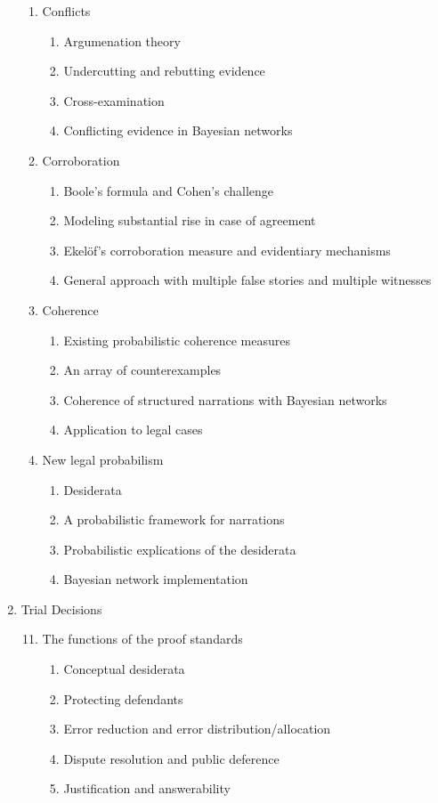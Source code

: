 \documentclass[10pt,dvipsnames,enabledeprecatedfontcommands]{scrartcl}
\begin{document}
\begin{enumerate}
\begin{enumerate}
  \item Conflicts
  \begin{enumerate}
  \item Argumenation theory
  \item Undercutting and rebutting evidence
  \item Cross-examination
  \item Conflicting evidence in Bayesian networks
  \end{enumerate}
 
 
  \item Corroboration
  \begin{enumerate}
  \item Boole's formula and Cohen's challenge
  \item  Modeling substantial rise in case of agreement
  \item Ekel\"of's corroboration measure and evidentiary mechanisms
  \item General approach with multiple false stories and multiple witnesses
  \end{enumerate}


  \item Coherence
  \begin{enumerate}
  \item  Existing probabilistic coherence measures
  \item  An array of counterexamples
  \item Coherence of structured narrations with Bayesian networks
  \item  Application to legal cases
  \end{enumerate}

  \item  New legal probabilism
    \begin{enumerate}
    \item  Desiderata
    \item  A probabilistic framework for narrations
    \item  Probabilistic explications of the desiderata
    \item  Bayesian network implementation
    \end{enumerate}


\end{enumerate}
\item  Trial Decisions
\begin{enumerate}



\setcounter{enumii}{10}
  \item  The functions of the proof standards
  \begin{enumerate}
  \item  Conceptual desiderata
  \item  Protecting defendants
  \item  Error reduction and error distribution/allocation
  \item  Dispute resolution and public deference
  \item  Justification and answerability
  \end{enumerate}




\end{enumerate}
\end{enumerate}
\end{document}
